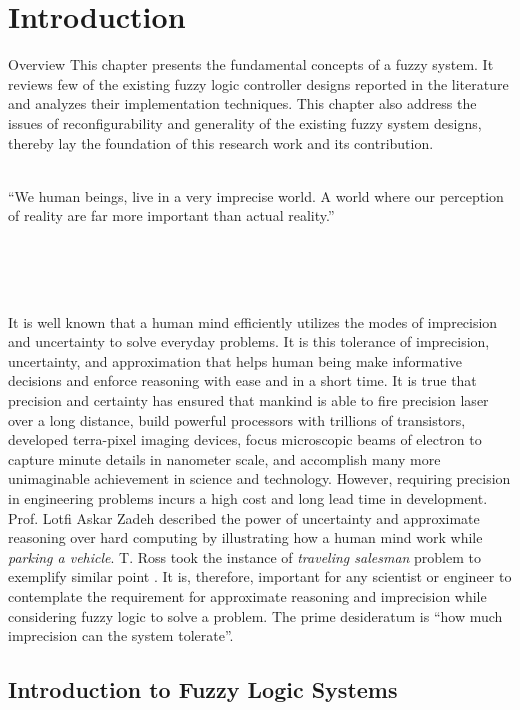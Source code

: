 \chapter{Introduction}
\begin{chapterAbstract}{Overview}
	This chapter presents the fundamental concepts of a fuzzy system. It reviews few of the existing fuzzy logic controller designs reported in the literature and analyzes their implementation techniques. This chapter also address the issues of reconfigurability and generality of the existing fuzzy system designs, thereby lay the foundation of this research work and its contribution. 
	
\end{chapterAbstract}
\clearpage
~\\
``We human beings, live in a very imprecise world. A world where our perception of reality are far more important than actual reality.''

\\
~\\
~\par
It is well known that a human mind efficiently utilizes the modes of imprecision and uncertainty to solve everyday problems. It is this tolerance of imprecision, uncertainty, and approximation that helps human being make informative decisions and enforce reasoning with ease and in a short time. It is true that precision and certainty has ensured that mankind is able to fire precision laser over a long distance, build powerful processors with trillions of transistors, developed terra\hyp{}pixel imaging devices, focus microscopic beams of electron to capture minute details in nanometer scale, and accomplish many more unimaginable achievement in science and technology. However, requiring precision in engineering problems incurs a high cost and long lead time in development. Prof. Lotfi Askar Zadeh described the power of uncertainty and approximate reasoning over hard computing by illustrating how a human mind work while \textit{parking a vehicle}\cite{Zadeh1993}. T. Ross took the instance of \textit{traveling salesman} problem to exemplify similar point \cite{Ross2010}. It is, therefore, important for any scientist or engineer to contemplate the requirement for approximate reasoning and imprecision while considering fuzzy logic to solve a problem. The prime desideratum is {``how much imprecision can the system tolerate''}.

\section{Introduction to Fuzzy Logic Systems}

